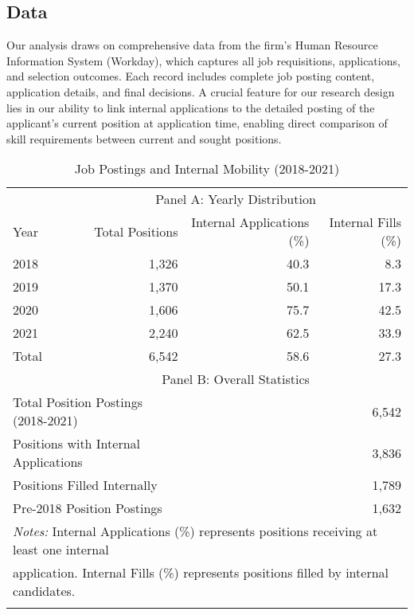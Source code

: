 \subsection{Data}

Our analysis draws on comprehensive data from the firm's Human Resource Information System (Workday), which 
captures all job requisitions, applications, and selection outcomes. Each record includes complete job posting 
content, application details, and final decisions. A crucial feature for our research design lies in our 
ability to link internal applications to the detailed posting of the applicant's current position at 
application time, enabling direct comparison of skill requirements between current and sought positions.

\begin{table}[t]
   \caption{Job Postings and Internal Mobility (2018-2021)}
   \begin{tabular*}{\textwidth}{@{\extracolsep\fill}lrrr}
   \toprule
   & \multicolumn{3}{c}{Panel A: Yearly Distribution} \\
   \cmidrule{2-4}
   Year & Total Positions & Internal Applications (\%) & Internal Fills (\%) \\
   \midrule
   2018 & 1,326 & 40.3 & 8.3 \\
   2019 & 1,370 & 50.1 & 17.3 \\
   2020 & 1,606 & 75.7 & 42.5 \\
   2021 & 2,240 & 62.5 & 33.9 \\
   \addlinespace
   Total & 6,542 & 58.6 & 27.3 \\
   \midrule
   & \multicolumn{3}{c}{Panel B: Overall Statistics} \\
   \cmidrule{2-4}
   \multicolumn{2}{l}{Total Position Postings (2018-2021)} & \multicolumn{2}{r}{6,542} \\
   \multicolumn{2}{l}{Positions with Internal Applications} & \multicolumn{2}{r}{3,836} \\
   \multicolumn{2}{l}{Positions Filled Internally} & \multicolumn{2}{r}{1,789} \\
   \multicolumn{2}{l}{Pre-2018 Position Postings} & \multicolumn{2}{r}{1,632} \\
   \bottomrule
   \multicolumn{4}{l}{\footnotesize \textit{Notes:} Internal Applications (\%) represents positions receiving at least one internal} \\
   \multicolumn{4}{l}{\footnotesize application. Internal Fills (\%) represents positions filled by internal candidates.} \\
   \label{tab:summary}
   \end{tabular*}
\end{table}

